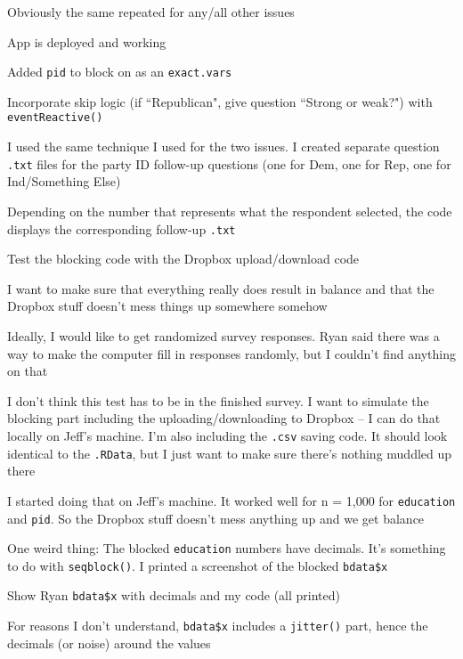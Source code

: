 \documentclass[12pt]{article}
\begin{document}
\begin{coi}
\begin{coi}
\begin{coi}
						\item Obviously the same repeated for any/all other issues
								\item App is deployed and working
					\end{coi}
				\item Added \texttt{pid} to block on as an \texttt{exact.vars}
				\item Incorporate skip logic (if ``Republican", give question ``Strong or weak?") with \texttt{eventReactive()}
					\begin{coi}
						\item I used the same technique I used for the two issues. I created separate question \texttt{.txt} files for the party ID follow-up questions (one for Dem, one for Rep, one for Ind/Something Else)
						\item Depending on the number that represents what the respondent selected, the code displays the corresponding follow-up \texttt{.txt}
					\end{coi}
				\item Test the blocking code with the Dropbox upload/download code
					\begin{coi}
						\item I want to make sure that everything really does result in balance and that the Dropbox stuff doesn't mess things up somewhere somehow
						\item Ideally, I would like to get randomized survey responses. Ryan said there was a way to make the computer fill in responses randomly, but I couldn't find anything on that
						\item I don't think this test has to be in the finished survey. I want to simulate the blocking part including the uploading/downloading to Dropbox -- I can do that locally on Jeff's machine. I'm also including the \texttt{.csv} saving code. It should look identical to the \texttt{.RData}, but I just want to make sure there's nothing muddled up there
						\item I started doing that on Jeff's machine. It worked well for n = 1,000 for \texttt{education} and \texttt{pid}. So the Dropbox stuff doesn't mess anything up and we get balance
						\item One weird thing: The blocked \texttt{education} numbers have decimals. It's something to do with \texttt{seqblock()}. I printed a screenshot of the blocked \texttt{bdata\$x}
						\item Show Ryan \texttt{bdata\$x} with decimals and my code (all printed)
						\item For reasons I don't understand, \texttt{bdata\$x} includes a \texttt{jitter()} part, hence the decimals (or noise) around the values

\end{coi}
\end{coi}
\end{coi}
\end{document}
